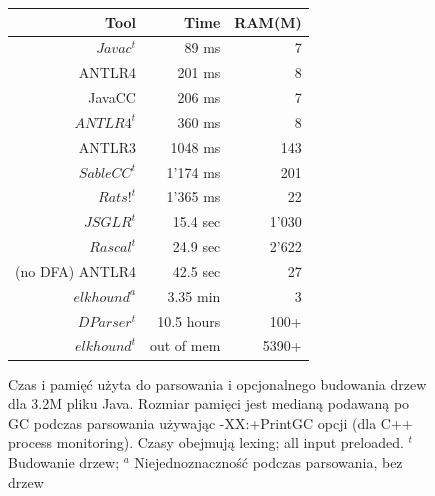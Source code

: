 \begin{figure}[h]
\begin{tabular}{|r||r|r|}
\hline
Tool & Time & RAM(M)\\
\hline\hline
$Javac^t$ & 89 ms & 7 \\
\hline
ANTLR4 & 201 ms & 8 \\
\hline
JavaCC & 206 ms & 7 \\
\hline
$ANTLR4^t$ & 360 ms  & 8 \\
\hline
ANTLR3 & 1048 ms &  143\\
\hline
$SableCC^t$ & 1'174 ms & 201 \\
\hline
$Rats!^t$ & 1'365 ms & 22 \\
\hline
$JSGLR^t$ & 15.4 sec & 1'030 \\
\hline
$Rascal^t$ & 24.9 sec & 2'622 \\
\hline
(no DFA) ANTLR4 & 42.5 sec & 27 \\
\hline
$elkhound^a$ & 3.35 min & 3 \\
\hline
$DParser^t$ & 10.5 hours & 100+ \\
\hline
$elkhound^t$ & out of mem & 5390+ \\
\hline
\end{tabular}
\caption{Czas i pamięć użyta do parsowania i opcjonalnego budowania drzew dla
3.2M pliku Java. Rozmiar pamięci jest medianą podawaną po GC podczas parsowania używając
-XX:+PrintGC opcji (dla C++ process monitoring). Czasy obejmują lexing; all input preloaded.
$^t$ Budowanie drzew; $^a$ Niejednoznaczność podczas parsowania, bez drzew}
\end{figure}

